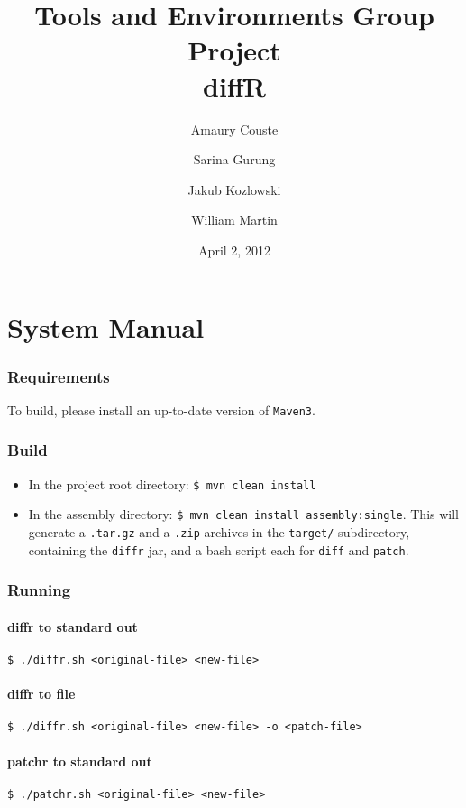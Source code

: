 \documentclass[10pt,a4paper]{article}
\author{Amaury Couste
\and Sarina Gurung
\and Jakub Kozlowski
\and William Martin}
\title{Tools and Environments Group Project\\diffR}
\date{April 2, 2012}
\begin{document}
\maketitle









\appendix
\section{System Manual}
\subsubsection*{Requirements}
To build, please install an up-to-date version of \texttt{Maven3}.

\subsubsection*{Build}
\begin{itemize}
\item In the project root directory: \texttt{\$ mvn clean install}
\item In the assembly directory: \texttt{\$ mvn clean install assembly:single}. This will generate a \texttt{.tar.gz} and a \texttt{.zip} archives in the \texttt{target/} subdirectory, containing the \texttt{diffr} jar, and a bash script each for \texttt{diff} and \texttt{patch}.
\end{itemize}

\subsubsection*{Running}
\paragraph{diffr to standard out} \texttt{\$ ./diffr.sh <original-file> <new-file>}
\paragraph{diffr to file} \texttt{\$ ./diffr.sh <original-file> <new-file> -o <patch-file>}

\paragraph{patchr to standard out} \texttt{\$ ./patchr.sh <original-file> <new-file>}
\end{document}

